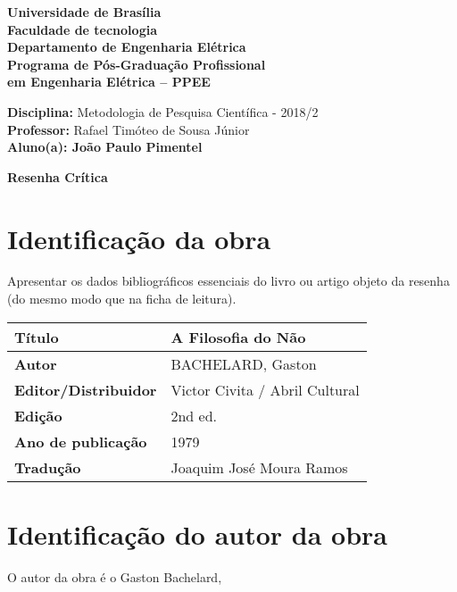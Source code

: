 \documentclass[11pt]{article}
\begin{document}
\noindent
\begin{center}
	\Large\textbf{Universidade de Brasília}\\
	\Large\textbf{Faculdade de tecnologia}\\
	\Large\textbf{Departamento de Engenharia Elétrica}\\
	\Large\textbf{Programa de Pós-Graduação Profissional \\
		em Engenharia Elétrica -- PPEE}\\
\end{center}

\large{
	\noindent
	\textbf{Disciplina:} Metodologia de Pesquisa Científica - 2018/2\\
	\textbf{Professor:} Rafael Timóteo de Sousa Júnior \\
	\textbf{Aluno(a): João Paulo Pimentel}}\\

\begin{center}
\Large\textbf{Resenha Crítica}
\end{center}
\normalsize

\section{Identificação da obra}
Apresentar os dados bibliográficos essenciais do livro ou artigo objeto da resenha (do mesmo modo que na ficha de leitura).

\begin{center}
	\begin{tabular}{|l|l|} \hline
		\textbf{Título} & A Filosofia do Não\cite{Bachelard1979} \\ \hline
		\textbf{Autor} & BACHELARD, Gaston \\ \hline
		\textbf{Editor/Distribuidor} & Victor Civita / Abril Cultural
 \\ \hline
		\textbf{Edição} & 2nd ed. \\ \hline
		\textbf{Ano de publicação} & 1979 \\ \hline
		\textbf{Tradução} &  Joaquim José Moura Ramos \\ \hline
	\end{tabular}
\end{center}

\section{Identificação do autor da obra}

O autor da obra é o Gaston Bachelard, 
\end{document}
